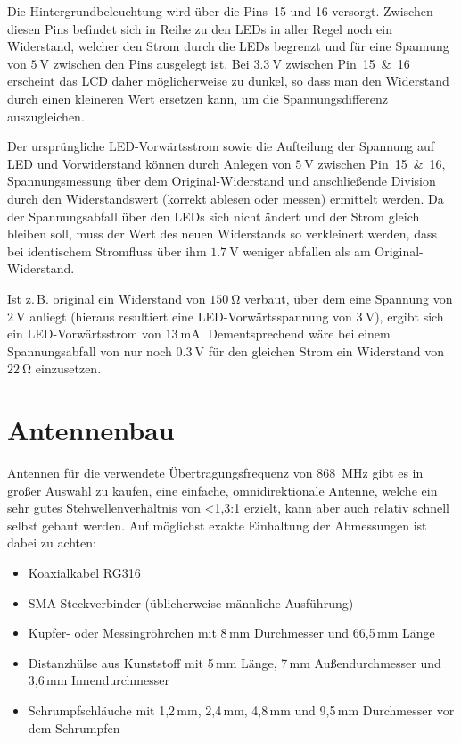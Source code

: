 \documentclass[paper=a4, parskip, numbers=noenddot, toc=listof, headsepline]{scrbook}
\begin{document}
			Die Hintergrundbeleuchtung wird über die Pins~15 und 16 versorgt. Zwischen diesen Pins befindet sich in Reihe zu den LEDs in aller Regel noch ein Widerstand, welcher den Strom durch die LEDs begrenzt und für eine Spannung von $\SI{5}{\volt}$ zwischen den Pins ausgelegt ist. Bei $\SI{3,3}{\volt}$ zwischen Pin~15~\&~16 erscheint das LCD daher möglicherweise zu dunkel, so dass man den Widerstand durch einen kleineren Wert ersetzen kann, um die Spannungsdifferenz auszugleichen.

			Der ursprüngliche LED-Vorwärtsstrom sowie die Aufteilung der Spannung auf LED und Vorwiderstand können durch Anlegen von $\SI{5}{\volt}$ zwischen Pin~15~\&~16, Spannungsmessung über dem Original-Widerstand und anschließende Division durch den Widerstandswert (korrekt ablesen oder messen) ermittelt werden. Da der Spannungsabfall über den LEDs sich nicht ändert und der Strom gleich bleiben soll, muss der Wert des neuen Widerstands so verkleinert werden, dass bei identischem Stromfluss über ihm $\SI{1,7}{\volt}$ weniger abfallen als am Original-Widerstand.

			Ist z.\,B. original ein Widerstand von $\SI{150}{\ohm}$ verbaut, über dem eine Spannung von $\SI{2}{\volt}$ anliegt (hieraus resultiert eine LED-Vorwärtsspannung von $\SI{3}{\volt}$), ergibt sich ein LED-Vorwärtsstrom von $\SI{13}{\milli\ampere}$. Dementsprechend wäre bei einem Spannungsabfall von nur noch $\SI{0,3}{\volt}$ für den gleichen Strom ein Widerstand von $\SI{22}{\ohm}$ einzusetzen.

		\section{Antennenbau}

			Antennen für die verwendete Übertragungsfrequenz von \SI{868}{\mega\hertz} gibt es in großer Auswahl zu kaufen, eine einfache, omnidirektionale Antenne, welche ein sehr gutes Stehwellenverhältnis von <1,3:1 erzielt, kann aber auch relativ schnell selbst gebaut werden. Auf möglichst exakte Einhaltung der Abmessungen ist dabei zu achten:
			\begin{itemize}
				\item Koaxialkabel RG316
				\item SMA-Steckverbinder (üblicherweise männliche Ausführung)
				\item Kupfer- oder Messingröhrchen mit 8\,mm Durchmesser und 66,5\,mm Länge
				\item Distanzhülse aus Kunststoff mit 5\,mm Länge, 7\,mm Außendurchmesser und 3,6\,mm Innendurchmesser
				\item Schrumpfschläuche mit 1,2\,mm, 2,4\,mm, 4,8\,mm und 9,5\,mm Durchmesser vor dem Schrumpfen
			\end{itemize}
\end{document}
